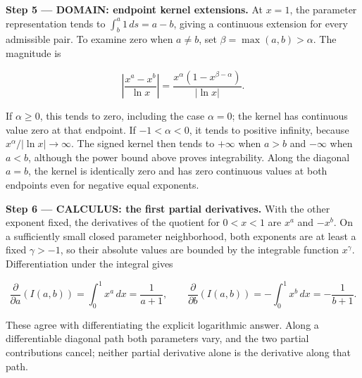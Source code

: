 \documentclass[11pt,oneside,openany]{book}
\begin{document}
\begin{DomainStep}
\textbf{Step 5 --- DOMAIN: endpoint kernel extensions.} At \(x=1\), the parameter representation tends to \(\int_b^a1\,ds=a-b\), giving a continuous extension for every admissible pair. To examine zero when \(a\ne b\), set \(\beta=\max(a,b)>\alpha\). The magnitude is

\[
\left|\frac{x^a-x^b}{\ln x}\right|
=\frac{x^\alpha(1-x^{\beta-\alpha})}{|\ln x|}.
\]

If \(\alpha\ge0\), this tends to zero, including the case \(\alpha=0\); the kernel has continuous value zero at that endpoint. If \(-1<\alpha<0\), it tends to positive infinity, because \(x^\alpha/|\ln x|\to\infty\). The signed kernel then tends to \(+\infty\) when \(a>b\) and \(-\infty\) when \(a<b\), although the power bound above proves integrability. Along the diagonal \(a=b\), the kernel is identically zero and has zero continuous values at both endpoints even for negative equal exponents.

\end{DomainStep}
\textbf{Step 6 --- CALCULUS: the first partial derivatives.} With the other exponent fixed, the derivatives of the quotient for \(0<x<1\) are \(x^a\) and \(-x^b\). On a sufficiently small closed parameter neighborhood, both exponents are at least a fixed \(\gamma>-1\), so their absolute values are bounded by the integrable function \(x^\gamma\). Differentiation under the integral gives

\[
\frac{\partial}{\partial a}(I(a,b))=\int_0^1x^a\,dx=\frac1{a+1},
\qquad
\frac{\partial}{\partial b}(I(a,b))=-\int_0^1x^b\,dx=-\frac1{b+1}.
\]

These agree with differentiating the explicit logarithmic answer. Along a differentiable diagonal path both parameters vary, and the two partial contributions cancel; neither partial derivative alone is the derivative along that path.
\end{document}
